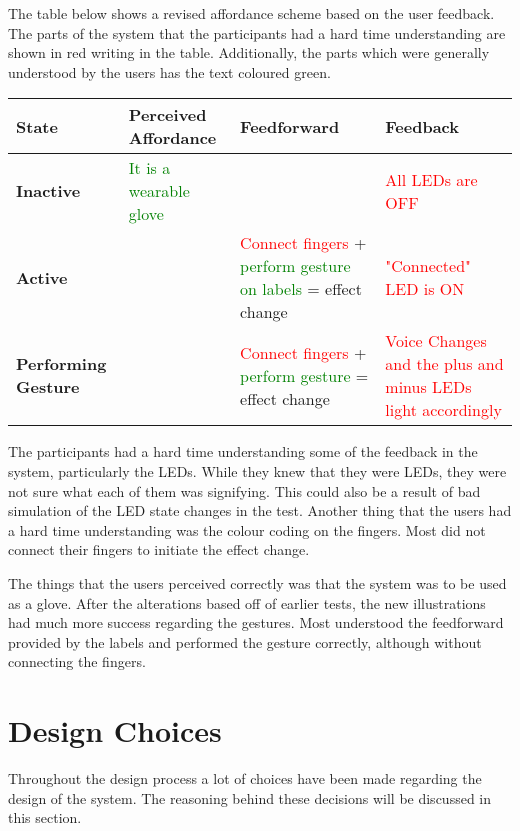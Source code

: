 The table below shows a revised affordance scheme based on the user feedback. The parts of the system that the participants had a hard time understanding are shown in red writing in the table. Additionally, the parts which were generally understood by the users has the text coloured green.

\begin{center}
  \begin{tabular}{| C{2cm} | C{3cm} | C{3cm} | C{3cm} |}
    \hline
    \textbf{State} & \textbf{Perceived Affordance} & \textbf{Feedforward} & \textbf{Feedback} \\ \hline
    \textbf{Inactive} & \textcolor{green}{It is a wearable glove} & & \textcolor{red}{All LEDs are OFF} \\ \hline
    \textbf{Active} &  & \textcolor{red}{Connect fingers} + \textcolor{green}{perform gesture on labels} = effect change & \textcolor{red}{"Connected" LED is ON} \\ \hline        
    \textbf{Performing Gesture} &  & \textcolor{red}{Connect fingers} + \textcolor{green}{perform gesture} = effect change & \textcolor{red}{Voice Changes and the plus and minus LEDs light accordingly} \\ \hline
  \end{tabular}
\end{center}

The participants had a hard time understanding some of the feedback in the system, particularly the LEDs. While they knew that they were LEDs, they were not sure what each of them was signifying. This could also be a result of bad simulation of the LED state changes in the test.
Another thing that the users had a hard time understanding was the colour coding on the fingers. Most did not connect their fingers to initiate the effect change.

The things that the users perceived correctly was that the system was to be used as a glove. After the alterations based off of earlier tests, the new illustrations had much more success regarding the gestures. Most understood the feedforward provided by the labels and performed the gesture correctly, although without connecting the fingers.

\section{Design Choices}

Throughout the design process a lot of choices have been made regarding the design of the system. The reasoning behind these decisions will be discussed in this section.\\

